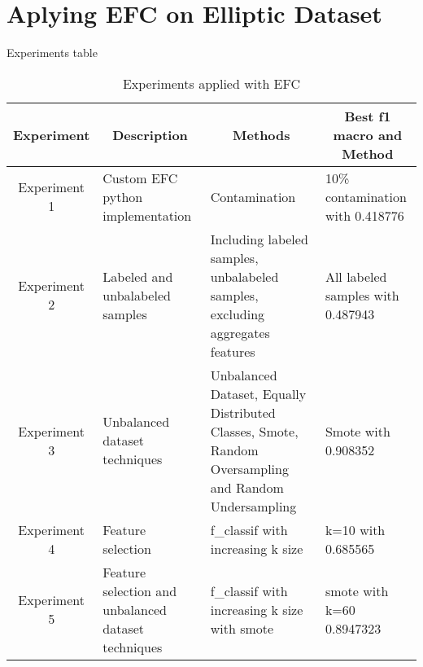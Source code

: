\section{Aplying EFC on Elliptic Dataset}
Experiments table

    \begin{table}[ht]
        \centering
        \caption{Experiments applied with EFC}
        \label{efc table experiments}
        \setlength{\tabcolsep}{2pt}
        \small
        \begin{tabular}{|c | p{5cm} | p{5cm} | p{5cm} |}
            \hline
            \multicolumn{1}{|c|}{\textbf{Experiment}} & \multicolumn{1}{c|}{\textbf{Description}} &
            \multicolumn{1}{c|}{\textbf{Methods}} & \multicolumn{1}{c|}{\textbf{Best f1 macro and Method}} \\ \hline
            \centering Experiment 1 & Custom EFC python implementation & Contamination& 10\% contamination with 0.418776 \\ \hline
                Experiment 2 & Labeled and unbalabeled samples & Including labeled samples, \newline unbalabeled samples, \newline excluding aggregates features & All labeled samples with 0.487943 \\ \hline
                Experiment 3 & Unbalanced dataset \newline techniques & Unbalanced Dataset, \newline Equally Distributed Classes, \newline Smote, Random Oversampling \newline and Random Undersampling & Smote with 0.908352 \\ \hline
                Experiment 4 & Feature \newline selection & f\_classif with increasing k size & k=10 with 0.685565 \\ \hline
                Experiment 5 & Feature selection and \newline unbalanced dataset \newline techniques & f\_classif with increasing k size with smote & smote with k=60 0.8947323 \\ \hline
        \end{tabular}
    \end{table}

